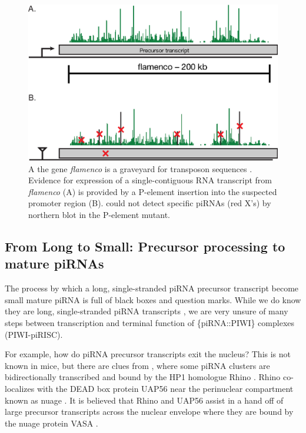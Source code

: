 {    \begin{figure} %
      \centering 
      \includegraphics{Figures/Intro/FlamencoLocus.eps}
      \caption[Genetic evidence for long, continuous fly piRNA precursor transcripts]
      {
        A the \flies{} gene \textit{flamenco} is a graveyard for transposon sequences \citep{Pelisson1994}. Evidence for expression of a single-contiguous RNA transcript from \textit{flamenco} (A) is provided by a P-element insertion into the suspected promoter region (B). \citep{Brennecke2007} could not detect specific piRNAs (red X's) by northern blot in the P-element mutant.
        }
      \label{Intro:fig:flamenco}
      \end{figure}

  \subsection{From Long to Small: Precursor processing to mature piRNAs}
    \label{Intro:subsec:Processing of piRNAs in mice}

    The process by which a long, single-stranded piRNA precursor transcript become small mature piRNA is full of black boxes and question marks. While we do know they are long, single-stranded piRNA transcripts \citep{Brennecke2007,Li2013e}, we are very unsure of many steps between transcription and terminal function of \{piRNA::PIWI\} complexes (PIWI-piRISC).

    For example, how do piRNA precursor transcripts exit the nucleus? This is not known in mice, but there are clues from \flies{}, where some piRNA clusters are bidirectionally transcribed and bound by the HP1 homologue Rhino \citep{Klattenhoff2009}. Rhino co-localizes with the DEAD box protein UAP56 near the perinuclear compartment known as nuage \citep{Zhang2012}. It is believed that Rhino and UAP56 assist in a hand off of large precursor transcripts across the nuclear envelope where they are bound by the nuage protein VASA \citep{Zhang2012}.

}
